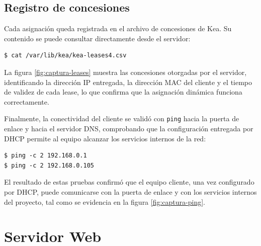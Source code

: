 \subsection{Registro de concesiones}

Cada asignación queda registrada en el archivo de concesiones de Kea. Su
contenido se puede consultar directamente desde el servidor:

\begin{lstlisting}[style=terminal]
$ cat /var/lib/kea/kea-leases4.csv
\end{lstlisting}

La figura \ref{fig:captura-leases} muestra las concesiones otorgadas por el
servidor, identificando la dirección IP entregada, la dirección MAC del
cliente y el tiempo de validez de cada lease, lo que confirma que la
asignación dinámica funciona correctamente.


Finalmente, la conectividad del cliente se validó con \texttt{ping} hacia la
puerta de enlace y hacia el servidor DNS, comprobando que la configuración
entregada por DHCP permite al equipo alcanzar los servicios internos de la
red:

\begin{lstlisting}[style=terminal]
$ ping -c 2 192.168.0.1
$ ping -c 2 192.168.0.105
\end{lstlisting}

El resultado de estas pruebas confirmó que el equipo cliente, una vez
configurado por DHCP, puede comunicarse con la puerta de enlace y con los
servicios internos del proyecto, tal como se evidencia en la figura
\ref{fig:captura-ping}.


\section{Servidor Web}

